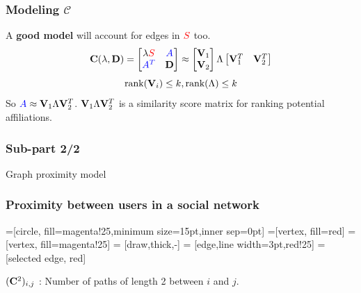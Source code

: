 \documentclass[handout]{beamer}
\begin{document}
\begin{frame}
\frametitle{Modeling $\mathcal{C}$}
\begin{itemize}
\pitem A \textbf{good model} will account for edges in $\textcolor{red}{S}$ too. 
\pause
\[\mathbf{C}(\lambda, \mathbf{D}) = \begin{bmatrix} \lambda \textcolor{red}{S}& \textcolor{blue}{A} \\ \textcolor{blue}{A^{T}}& \mathbf{D}\end{bmatrix} \approx \begin{bmatrix} \mathbf{V}_1 \\ \mathbf{V}_2 \end{bmatrix} \Lambda \begin{bmatrix} \mathbf{V}_1^{T} & \mathbf{V}_2^{T} \end{bmatrix}\]
\[\text{rank}(\mathbf{V}_i) \leq k, \text{rank}(\Lambda) \leq k \]
\pitem So $\textcolor{blue}{A} \approx \mathbf{V}_1 \Lambda \mathbf{V}_2^T$.
\pitem $\mathbf{V}_1 \Lambda \mathbf{V}_2^T$ is a similarity score matrix for ranking potential affiliations.
\end{itemize}
\end{frame}

\begin{frame}{}
 \frametitle{Sub-part 2/2}
  \hspace{1.1in}
  \centerline{\huge{Graph proximity model}}
\end{frame}

\begin{frame}
\frametitle{Proximity between users in a social network}
=[circle, fill=magenta!25,minimum size=15pt,inner sep=0pt]
=[vertex, fill=red]
=[vertex, fill=magenta!25]
 = [draw,thick,-]
 = [edge,line width=3pt,red!25]
 = [selected edge, red]

\begin{center}
\end{center}
\pause
$(\mathbf{C}^{2})_{i,j}$ : Number of paths of length 2 between $i$ and $j$.
\end{frame}
\end{document}
